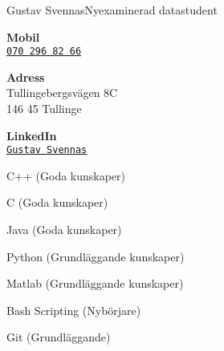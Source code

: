 \documentclass{article}
\begin{document}
\begin{cv}[avatar]{Gustav Svennas}{Nyexaminerad datastudent}
\cvseparator[3]
\begin{cvitem}[Phone][4]
    \textbf{Mobil}\\
    \href{tel:+46702968266}{\texttt{070 296 82 66}}
\end{cvitem}

\cvseparator[3]
\begin{cvitem}[Home][4]
    \textbf{Adress}\\
    Tullingebergsvägen 8C\\ 146 45 Tullinge
\end{cvitem}

\cvseparator[3]
\begin{cvitem}[Globe][4]
    \textbf{LinkedIn}\\
    \href{https://www.linkedin.com/in/gustav-svennas-18b575159}{\texttt{Gustav Svennas}}
\end{cvitem}



\begin{cvitem}
    C++ (Goda kunskaper)
\end{cvitem}

\begin{cvitem}
    C (Goda kunskaper)
\end{cvitem}

\begin{cvitem}
    Java (Goda kunskaper)
\end{cvitem}

\begin{cvitem}
    Python (Grundläggande kunskaper)
\end{cvitem}

\cvseparator
\begin{cvitem}
    Matlab (Grundläggande kunskaper)
\end{cvitem}

\cvseparator
\begin{cvitem}
    Bash Scripting (Nybörjare)
\end{cvitem}


\cvseparator
\begin{cvitem}
    Git (Grundläggande)
\end{cvitem}




\end{cv}
\end{document}
